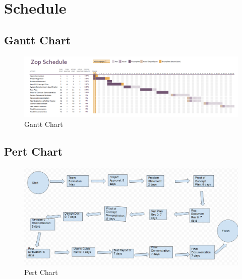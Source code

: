 \documentclass[12pt]{article}
\begin{document}
\section{Schedule}
\subsection{Gantt Chart}

\begin{figure}[h!]
\includegraphics[width=17cm]{gantt}
\caption{Gantt Chart}
\end{figure}

\subsection{Pert Chart}

\begin{figure}[h!]
\includegraphics[width=17cm]{pert}
\caption{Pert Chart}
\end{figure}
\end{document}

